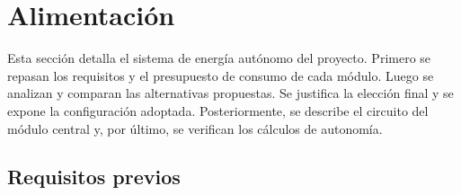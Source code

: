 








\section{Alimentación}
\label{sec:alimentacion}

Esta sección detalla el sistema de energía autónomo del proyecto. Primero se repasan los requisitos y el presupuesto de consumo de cada módulo. Luego se analizan y comparan las alternativas propuestas. Se justifica la elección final y se expone la configuración adoptada. Posteriormente, se describe el circuito del módulo central y, por último, se verifican los cálculos de autonomía.

\subsection{Requisitos previos}

